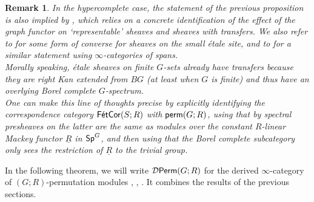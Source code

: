 \documentclass[reqno]{amsart}
\numberwithin{equation}{section}\theoremstyle{thms}
\theoremstyle{defn}
\newtheorem{rem}[equation]{Remark}
\newcommand{\cD}{\mathcal{D}}
\newcommand{\tsf}[1]{\textsf{\textup{#1}}}
\newcommand{\underl}[1]{\underline{#1}}
\newcommand{\specg}{\tsf{Sp}^G}
\newcommand{\permgr}{\tsf{perm}(G;R)}
\newcommand{\Perm}{\tsf{Perm}}
\newcommand{\corfets}[1]{\tsf{FétCor}(S;#1)}
\begin{document}
\begin{rem}
In the hypercomplete case, the statement of the previous proposition is also implied by \cite[Corollary 2.1.9]{cd16}, which relies on a concrete identification of the effect of the graph functor on `representable' sheaves and sheaves with transfers. We also refer to \cite[Corollary 4.39]{cm21} for some form of converse for sheaves on the small étale site, and to \cite[Corollary C.13]{bh21} for a similar statement using $\infty$-categories of spans. \\
Morally speaking, étale sheaves on finite $G$-sets already have transfers because they are right Kan extended from $BG$ (at least when $G$ is finite) and thus have an overlying Borel complete $G$-spectrum. \\
One can make this line of thoughts precise by explicitly identifying the correspondence category $\corfets{R}$ with $\permgr$, using that by \cite[Corollary 3.17]{fuh25} spectral presheaves on the latter are the same as modules over the constant $R$-linear Mackey functor $\underl{R}$ in $\specg$, and then using that the Borel complete subcategory only sees the restriction of $\underl{R}$ to the trivial group. 
\end{rem}

In the following theorem, we will write $\cD\Perm(G;R)$ for the derived $\infty$-category of $(G;R)$-permutation modules \cite{bg22a}, \cite[§3]{bg23}, \cite[§4]{fuh25}. It combines the results of the previous sections.
\end{document}
